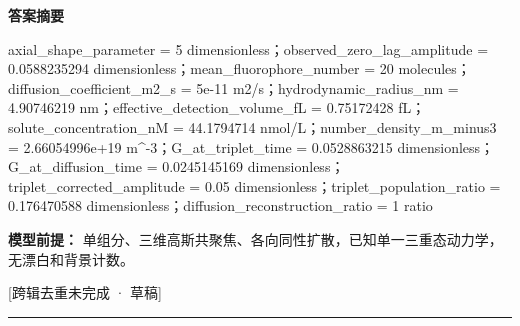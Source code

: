 \documentclass[UTF8,11pt,a4paper]{ctexart}
\begin{document}
\noindent\textbf{答案摘要}\par
axial\_shape\_parameter = 5 dimensionless；observed\_zero\_lag\_amplitude = 0.0588235294 dimensionless；mean\_fluorophore\_number = 20 molecules；diffusion\_coefficient\_m2\_s = 5e-11 m2/s；hydrodynamic\_radius\_nm = 4.90746219 nm；effective\_detection\_volume\_fL = 0.75172428 fL；solute\_concentration\_nM = 44.1794714 nmol/L；number\_density\_m\_minus3 = 2.66054996e+19 m\textasciicircum{}-3；G\_at\_triplet\_time = 0.0528863215 dimensionless；G\_at\_diffusion\_time = 0.0245145169 dimensionless；triplet\_corrected\_amplitude = 0.05 dimensionless；triplet\_population\_ratio = 0.176470588 dimensionless；diffusion\_reconstruction\_ratio = 1 ratio\par
\noindent\textbf{模型前提：}
单组分、三维高斯共聚焦、各向同性扩散，已知单一三重态动力学，无漂白和背景计数。\par
\noindent\textcolor{red!65!black}{[跨辑去重未完成 · 草稿]} \par
\medskip\hrule\medskip
{}
\end{document}

